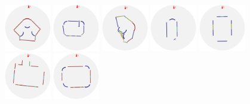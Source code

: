 \begin{figure}[t]
  \includegraphics[width=0.8in]{../gi2012_userstudy/images/section4/3_2D_walls_rotate} %
  \includegraphics[width=0.8in]{../gi2012_userstudy/images/section4/4_2D_walls_rotate} %
  \includegraphics[width=0.8in]{../gi2012_userstudy/images/section4/6_2D_walls_rotate} %
  \includegraphics[width=0.8in]{../gi2012_userstudy/images/section4/7_2D_walls_rotate} %
  \includegraphics[width=0.8in]{../gi2012_userstudy/images/section4/10_2D_walls_rotate} %
  \includegraphics[width=0.8in]{../gi2012_userstudy/images/section4/11_2D_walls_rotate} %
  \includegraphics[width=0.8in]{../gi2012_userstudy/images/section4/12_2D_walls_rotate} %
\vspace{-2.35in}
\\
\begin{minipage}{1.62in}~\end{minipage}

\end{figure}
